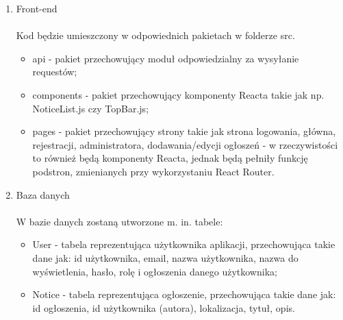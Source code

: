 \documentclass{article}
\begin{document}
{\begin{enumerate}
\begin{itemize}
    \end{itemize}
    \item Front-end \\ \\
        Kod będzie umieszczony w odpowiednich pakietach w folderze src.
        \begin{itemize}
            \item api - pakiet przechowujący moduł odpowiedzialny za wysyłanie requestów;
            \item components - pakiet przechowujący komponenty Reacta takie jak np. NoticeList.js czy TopBar.js;
            \item pages - pakiet przechowujący strony takie jak strona logowania, główna, rejestracji, administratora, dodawania/edycji ogłoszeń - w rzeczywistości to również będą komponenty Reacta, jednak będą pełniły funkcję podstron, zmienianych przy wykorzystaniu React Router.
        \end{itemize}
    \item Baza danych \\ \\
        W bazie danych zostaną utworzone m. in. tabele:
        \begin{itemize}
            \item User - tabela reprezentująca użytkownika aplikacji, przechowująca takie dane jak: id użytkownika, email, nazwa użytkownika, nazwa do wyświetlenia, hasło, rolę i ogłoszenia danego użytkownika;
            \item Notice - tabela reprezentująca ogłoszenie, przechowująca takie dane jak: id ogłoszenia, id użytkownika (autora), lokalizacja, tytuł, opis.
        \end{itemize}
\end{enumerate}
}
\end{document}
